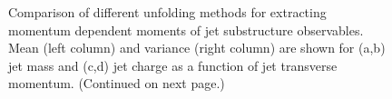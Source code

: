 \begin{figure}
    \caption[Comparison of unfolding methods for momentum-dependent jet moments]{Comparison of different unfolding methods for extracting momentum dependent moments of jet substructure observables. Mean (left column) and variance (right column) are shown for (a,b) jet mass and (c,d) jet charge as a function of jet transverse momentum. (Continued on next page.)}
    \label{fig:method-comparison}
\end{figure}

\begin{figure}
    \ContinuedFloat
    \centering
    \\


\end{figure}
